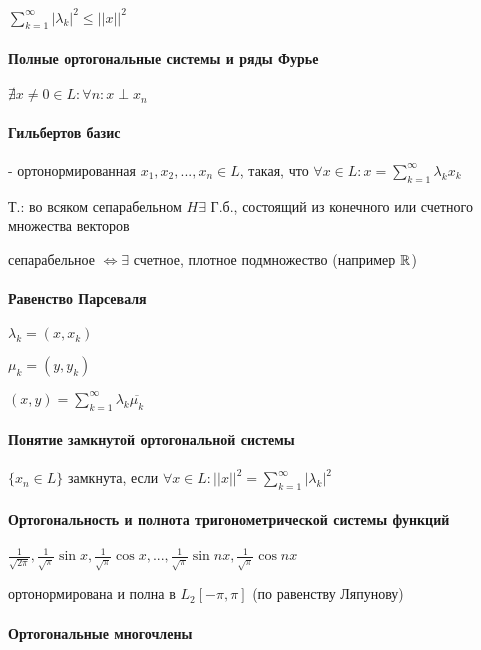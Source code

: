 \documentclass[russian,twocolumn]{article}
\begin{document}
$\sum _{k=1}^\infty |\lambda _k|^2 \le ||x||^2$

\paragraph{Полные ортогональные системы и ряды Фурье}

$\nexists x \ne 0 \in L : \forall n : x \perp x_n$

\paragraph{Гильбертов базис}

- ортонормированная $x_1,x_2,...,x_n \in L$, такая, что $\forall x \in L : x=\sum _{k=1}^\infty \lambda _k x_k$ 

Т.: во всяком сепарабельном $H \exists $ Г.б., состоящий из конечного или счетного множества векторов

сепарабельное $ \iff \exists $ счетное, плотное подмножество (например $\Bbb R$)

\paragraph{Равенство Парсеваля}

$\lambda _k = (x,x_k)$

$\mu _k = (y,y_k)$

$(x,y) = \sum_{k=1}^\infty \lambda_k \overline{\mu_k}$

\paragraph{Понятие замкнутой ортогональной системы}

$\{x_n \in L\}$ замкнута, если $\forall x \in L : ||x||^2=\sum _{k=1}^\infty |\lambda _k|^2$

\paragraph{Ортогональность и полнота тригонометрической системы функций}

$\frac{1}{\sqrt{2\pi}}, \frac{1}{\sqrt{\pi}}\sin x, \frac{1}{\sqrt{\pi}} \cos x, ..., \frac{1}{\sqrt{\pi}}\sin nx, \frac{1}{\sqrt{\pi}}\cos nx$ 

ортонормирована и полна в $L_2[-\pi, \pi]$ (по равенству Ляпунову)

\paragraph{Ортогональные многочлены}
\end{document}
